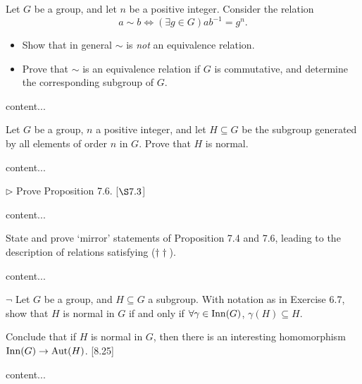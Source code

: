 \begin{exercise}
	Let $G$ be a group, and let $n$ be a positive integer. Consider the relation
	\[
		a \sim b \iff (\exists g \in G) ab^{-1} = g^n.
	\]
	\begin{itemize}
		\item Show that in general $\sim$ is \emph{not} an equivalence relation.
		\item Prove that $\sim$ is an equivalence relation if $G$ is commutative, and determine the corresponding subgroup of $G$.
	\end{itemize}
\end{exercise}
\begin{solution}
	content...
\end{solution}

\begin{exercise}
	Let $G$ be a group, $n$ a positive integer, and let $H\subseteq G$ be the subgroup generated by all elements of order $n$ in $G$. Prove that $H$ is normal.
\end{exercise}
\begin{solution}
	content...
\end{solution}

\begin{exercise}
	$\triangleright$ Prove Proposition 7.6. [$\S 7.3$]
\end{exercise}
\begin{solution}
	content...
\end{solution}

\begin{exercise}
	State and prove `mirror' statements of Proposition 7.4 and 7.6, leading to the description of relations satisfying ($\dagger \dagger$).
\end{exercise}
\begin{solution}
	content...
\end{solution}

\begin{exercise}
	$\neg$ Let $G$ be a group, and $H \subseteq G$ a subgroup. With notation as in Exercise 6.7, show that $H$ is normal in $G$ if and only if $\forall\gamma \in \operatorname{Inn}(G)$, $\gamma(H)\subseteq H$.
	
	Conclude that if $H$ is normal in $G$, then there is an interesting homomorphism $\operatorname{Inn}(G) \to \operatorname{Aut}(H)$. [8.25]
\end{exercise}
\begin{solution}
	content...
\end{solution}

